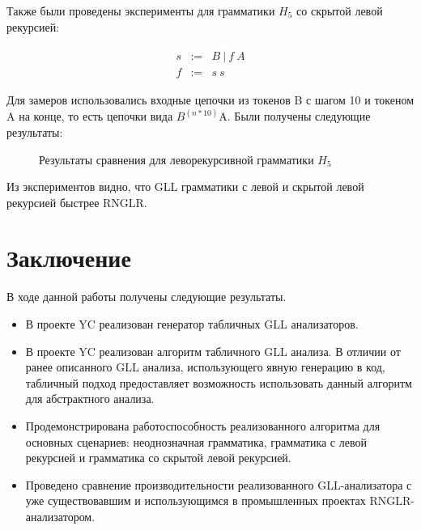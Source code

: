 Также были проведены эксперименты для грамматики $H_5$ со скрытой левой рекурсией:

\begin{align*}
\begin{array}{ccl} s & := & B \ | \ f \ A \\ f & := & s \ s \end{array}
\end{align*}
	
Для замеров использовались входные цепочки из токенов B с шагом 10 и токеном A на конце, то есть цепочки вида $B^(n*10)$A. Были получены следующие результаты:

\begin{figure}[h]
\caption{Результаты сравнения для леворекурсивной грамматики $H_5$}
\label{fig12}
\end{figure}

Из экспериментов видно, что GLL грамматики с левой и скрытой левой рекурсией быстрее RNGLR.

\section*{Заключение}
В ходе данной работы получены следующие результаты.
\begin{itemize}
\item В проекте YC реализован генератор табличных GLL анализаторов.
\item В проекте YC реализован алгоритм табличного GLL анализа. В отличии от ранее описанного GLL анализа, использующего явную генерацию в код, табличный подход предоставляет возможность использовать данный алгоритм для абстрактного анализа.
\item Продемонстрирована работоспособность реализованного алгоритма для основных сценариев: неоднозначная грамматика, грамматика с левой рекурсией и грамматика со скрытой левой рекурсией.
\item Проведено сравнение производительности реализованного GLL-анализатора с уже существовавшим и использующимся в промышленных проектах RNGLR-анализатором.
\end{itemize}

